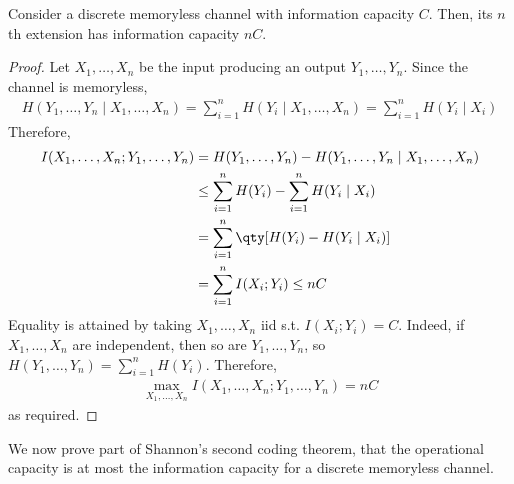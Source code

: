 \begin{lemma}
    Consider a discrete memoryless channel with information capacity $C$.
    Then, its $n$th extension has information capacity $nC$.
\end{lemma}
\begin{proof}
    Let $X_1, \dots, X_n$ be the input producing an output $Y_1, \dots, Y_n$.
    Since the channel is memoryless,
    \begin{align*}
        H(Y_1, \dots, Y_n \mid X_1, \dots, X_n) = \sum_{i=1}^n H(Y_i \mid X_1, \dots, X_n) = \sum_{i=1}^n H(Y_i \mid X_i)
    \end{align*}
    Therefore,
    \begin{align*}
        I(X_1, \dots, X_n; Y_1, \dots, Y_n) &= H(Y_1, \dots, Y_n) - H(Y_1, \dots, Y_n \mid X_1, \dots, X_n) \\
        &\leq \sum_{i=1}^n H(Y_i) - \sum_{i=1}^n H(Y_i \mid X_i) \\
        &= \sum_{i=1}^n \qty[H(Y_i) - H(Y_i \mid X_i)] \\
        &= \sum_{i=1}^n I(X_i;Y_i) \leq nC
    \end{align*}
    Equality is attained by taking $X_1, \dots, X_n$ iid s.t. $I(X_i;Y_i) = C$.
    Indeed, if $X_1, \dots, X_n$ are independent, then so are $Y_1, \dots, Y_n$, so $H(Y_1, \dots, Y_n) = \sum_{i=1}^n H(Y_i)$.
    Therefore,
    \begin{align*}
        \max_{X_1, \dots, X_n} I(X_1, \dots, X_n; Y_1, \dots, Y_n) = nC
    \end{align*}
    as required.
\end{proof}
We now prove part of Shannon's second coding theorem, that the operational capacity is at most the information capacity for a discrete memoryless channel.
